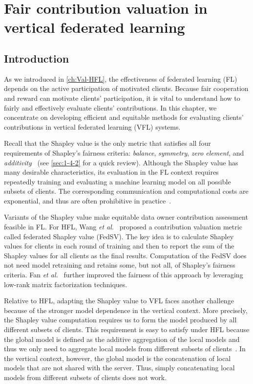\chapter{Fair contribution valuation in vertical federated
learning}
\label{ch:Val-VFL}

\section{Introduction} \label{sec:8-1}
As we introduced in \autoref{ch:Val-HFL}, the effectiveness of federated
learning (FL) depends on the active participation of motivated clients. Because fair cooperation and reward can motivate clients' participation, it is vital to understand how to fairly and effectively evaluate clients' contributions. In this chapter, we concentrate on developing efficient and equitable methods for evaluating clients' contributions in vertical federated learning (VFL) systems.

Recall that the Shapley value is the only metric that satisfies all four requirements of Shapley's fairness criteria: \emph{balance}, \emph{symmetry}, \emph{zero element}, and \emph{additivity}~\cite{dubey1975uniqueness} (see \autoref{sec:1-4-2} for a quick review).  Although the Shapley value has many desirable characteristics, its evaluation in the FL context requires repeatedly training and evaluating a machine learning model on all possible subsets of clients. The corresponding communication and computational costs are exponential, and thus are often prohibitive in practice~\cite{song2019profit,wang2019measure,fan2021improving}. 

Variants of the Shapley value make equitable data owner contribution assessment feasible in FL. For HFL, Wang \textit{et al.}~\cite{wang2020principled} proposed a contribution valuation metric called federated Shapley value (FedSV). The key idea is to calculate Shapley values for clients in each round of training and then to report the sum of the Shapley values for all clients as the final results. Computation of the FedSV does not need model retraining and retains some, but not all, of Shapley's fairness criteria. Fan \textit{et al.}~\cite{fan2021improving} further improved the fairness of this approach by leveraging low-rank matrix factorization techniques. 

Relative to HFL, adapting the Shapley value to VFL faces another challenge because of the stronger model dependence in the vertical context. More precisely, the Shapley value computation requires us to form the model produced by all different subsets of clients. This requirement is easy to satisfy under HFL because the global model is defined as the additive aggregation of the local models and thus we only need to aggregate local models from different subsets of clients~\cite{wang2020principled}. In the vertical context, however, the global model is the concatenation of local models that are not shared with the server. Thus, simply concatenating local models from different subsets of clients does not work. 

